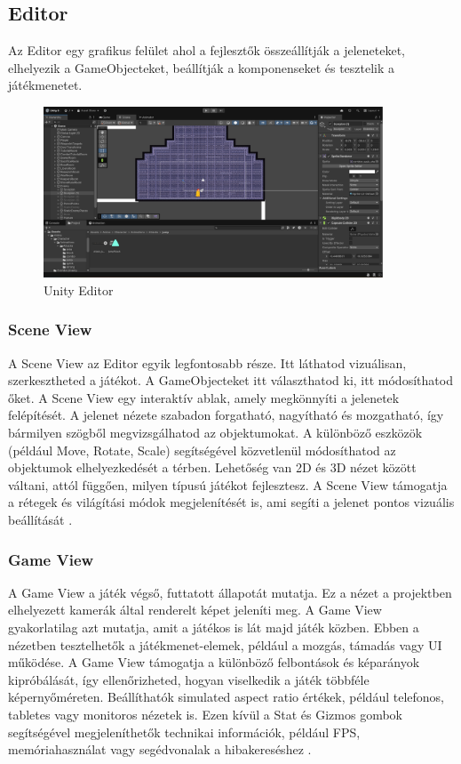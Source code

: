 \documentclass[
]{thesis-ekf}
\theoremstyle{definition}
\theoremstyle{remark}
\begin{document}
\subsection{Editor}
Az Editor egy grafikus felület ahol a fejlesztők összeállítják a jeleneteket, elhelyezik a GameObjecteket, beállítják a komponenseket és tesztelik a játékmenetet.

\begin{figure}[h!]
	\centering
	\includegraphics[width=0.9\textwidth]{UnityEditorKep.png}
	\caption{Unity Editor}
	\label{fig:unityEditor}
\end{figure}

\subsubsection{Scene View}
A Scene View az Editor egyik legfontosabb része. Itt láthatod vizuálisan, szerkesztheted a játékot. A GameObjecteket itt választhatod ki, itt módosíthatod őket. A Scene View egy interaktív ablak, amely megkönnyíti a jelenetek felépítését.
A jelenet nézete szabadon forgatható, nagyítható és mozgatható, így bármilyen szögből megvizsgálhatod az objektumokat. A különböző eszközök (például Move, Rotate, Scale) segítségével közvetlenül módosíthatod az objektumok elhelyezkedését a térben. Lehetőség van 2D és 3D nézet között váltani, attól függően, milyen típusú játékot fejlesztesz. A Scene View támogatja a rétegek és világítási módok megjelenítését is, ami segíti a jelenet pontos vizuális beállítását \cite{UnityScene}.
\subsubsection{Game View}
A Game View a játék végső, futtatott állapotát mutatja. Ez a nézet a projektben elhelyezett kamerák által renderelt képet jeleníti meg. A Game View gyakorlatilag azt mutatja, amit a játékos is lát majd játék közben.
Ebben a nézetben tesztelhetők a játékmenet-elemek, például a mozgás, támadás vagy UI működése. A Game View támogatja a különböző felbontások és képarányok kipróbálását, így ellenőrizheted, hogyan viselkedik a játék többféle képernyőméreten. Beállíthatók simulated aspect ratio értékek, például telefonos, tabletes vagy monitoros nézetek is. Ezen kívül a Stat és Gizmos gombok segítségével megjeleníthetők technikai információk, például FPS, memóriahasználat vagy segédvonalak a hibakereséshez \cite{UnityGameView}.
\end{document}
